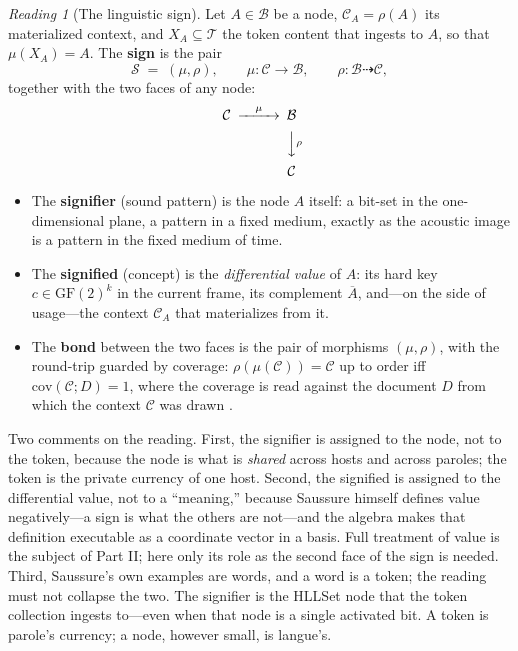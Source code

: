 \documentclass[11pt,a4paper]{article}
\theoremstyle{remark}
\newtheorem{reading}[principle]{Reading}
\newcommand{\Lat}{\ensuremath{\mathcal{B}}}              %
\newcommand{\Tok}{\ensuremath{\mathcal{T}}}              %
\newcommand{\Ctx}{\ensuremath{\mathcal{C}}}              %
\newcommand{\Ing}{\ensuremath{\mu}}                      %
\newcommand{\Mat}{\ensuremath{\rho}}                     %
\newcommand{\Sign}{\ensuremath{\mathcal{S}}}             %
\newcommand{\Cov}{\ensuremath{\mathrm{cov}}}             %
\begin{document}
\begin{reading}[The linguistic sign]
\label{read:sign}
Let $A \in \Lat$ be a node, $\Ctx_A = \Mat(A)$ its materialized context, and
$X_A \subseteq \Tok$ the token content that ingests to $A$, so that
$\Ing(X_A) = A$. The \textbf{sign} is the pair
\[
  \Sign \;=\; (\Ing, \Mat),
  \qquad
  \Ing : \Ctx \to \Lat, \qquad \Mat : \Lat \dashrightarrow \Ctx,
\]
together with the two faces of any node:
\[
\begin{CD}
\Ctx @>{\Ing}>> \Lat \\
@. @VV{\Mat}V \\
@. \Ctx
\end{CD}
\]
\begin{itemize}[leftmargin=*,nosep]
  \item The \textbf{signifier} (sound pattern) is the node $A$ itself: a
    bit-set in the one-dimensional plane, a pattern in a fixed medium, exactly
    as the acoustic image is a pattern in the fixed medium of time.
  \item The \textbf{signified} (concept) is the \emph{differential value} of
    $A$: its hard key $c \in \mathrm{GF}(2)^k$ in the current frame, its
    complement $\overline{A}$, and---on the side of usage---the context
    $\Ctx_A$ that materializes from it.
  \item The \textbf{bond} between the two faces is the pair of morphisms
    $(\Ing,\Mat)$, with the round-trip guarded by coverage:
    $\Mat(\Ing(\Ctx)) = \Ctx$ up to order iff $\Cov(\Ctx; D) = 1$,
    where the coverage is read against the document $D$ from which the
    context $\Ctx$ was drawn \cite{langue2026}.
\end{itemize}
\end{reading}

Two comments on the reading. First, the signifier is assigned to the node, not
to the token, because the node is what is \emph{shared} across hosts and across
paroles; the token is the private currency of one host. Second, the signified
is assigned to the differential value, not to a ``meaning,'' because Saussure
himself defines value negatively---a sign is what the others are not---and the
algebra makes that definition executable as a coordinate vector in a basis.
Full treatment of value is the subject of Part II; here only its role as the
second face of the sign is needed. Third, Saussure's own examples are words,
and a word is a token; the reading must not collapse the two. The signifier
is the HLLSet node that the token collection ingests to---even when that node
is a single activated bit. A token is parole's currency; a node, however
small, is langue's.
\end{document}
